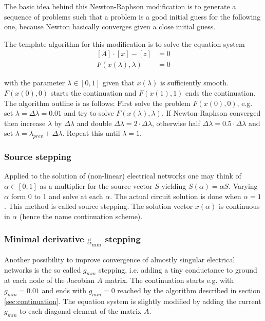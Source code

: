 The basic idea behind this Newton-Raphson modification is to generate
a sequence of problems such that a problem is a good initial guess for
the following one, because Newton basically converges given a close
initial guess.

\addvspace{12pt}

The template algorithm for this modification is to solve the equation
system
\begin{align}
\left[A\right] \cdot \left[x\right] - \left[z\right] &= 0\\
F\left(x\left(\lambda\right), \lambda\right) &= 0
\end{align}

with the parameter $\lambda \in [0,1]$ given that
$x\left(\lambda\right)$ is sufficiently smooth.
$F\left(x\left(0\right), 0\right)$ starts the continuation and
$F\left(x\left(1\right), 1\right)$ ends the continuation.  The
algorithm outline is as follows: First solve the problem
$F\left(x\left(0\right), 0\right)$, e.g. set $\lambda = \Delta\lambda
= 0.01$ and try to solve $F\left(x\left(\lambda\right),
\lambda\right)$.  If Newton-Raphson converged then increase $\lambda$
by $\Delta\lambda$ and double $\Delta\lambda = 2\cdot \Delta\lambda$,
otherwise half $\Delta\lambda = 0.5\cdot \Delta\lambda$ and set
$\lambda = \lambda_{prev} + \Delta\lambda$.  Repeat this until
$\lambda = 1$.

\subsubsection{Source stepping}

Applied to the solution of (non-linear) electrical networks one may
think of $\alpha \in [0,1]$ as a multiplier for the source vector $S$
yielding $S\left(\alpha\right) = \alpha S$.  Varying $\alpha$ form 0
to 1 and solve at each $\alpha$.  The actual circuit solution is done
when $\alpha = 1$.  This method is called source stepping.  The
solution vector $x\left(\alpha\right)$ is continuous in $\alpha$
(hence the name continuation scheme).

\subsubsection{Minimal derivative $\mathrm{g_{min}}$ stepping}

Another possibility to improve convergence of almostly singular
electrical networks is the so called $g_{min}$ stepping, i.e. adding a
tiny conductance to ground at each node of the Jacobian $A$ matrix.
The continuation starts e.g. with $g_{min} = 0.01$ and ends with
$g_{min} = 0$ reached by the algorithm described in section
\ref{sec:continuation}.  The equation system is slightly modified by
adding the current $g_{min}$ to each diagonal element of the matrix
$A$.
